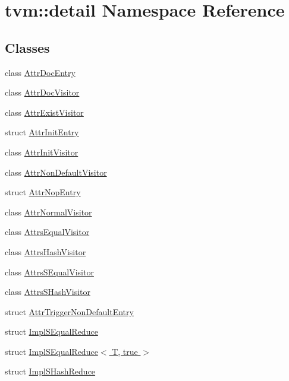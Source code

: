 \hypertarget{namespacetvm_1_1detail}{}\section{tvm\+:\+:detail Namespace Reference}
\label{namespacetvm_1_1detail}
\subsection*{Classes}
\begin{DoxyCompactItemize}
\item 
class \hyperlink{classtvm_1_1detail_1_1AttrDocEntry}{Attr\+Doc\+Entry}
\item 
class \hyperlink{classtvm_1_1detail_1_1AttrDocVisitor}{Attr\+Doc\+Visitor}
\item 
class \hyperlink{classtvm_1_1detail_1_1AttrExistVisitor}{Attr\+Exist\+Visitor}
\item 
struct \hyperlink{structtvm_1_1detail_1_1AttrInitEntry}{Attr\+Init\+Entry}
\item 
class \hyperlink{classtvm_1_1detail_1_1AttrInitVisitor}{Attr\+Init\+Visitor}
\item 
class \hyperlink{classtvm_1_1detail_1_1AttrNonDefaultVisitor}{Attr\+Non\+Default\+Visitor}
\item 
struct \hyperlink{structtvm_1_1detail_1_1AttrNopEntry}{Attr\+Nop\+Entry}
\item 
class \hyperlink{classtvm_1_1detail_1_1AttrNormalVisitor}{Attr\+Normal\+Visitor}
\item 
class \hyperlink{classtvm_1_1detail_1_1AttrsEqualVisitor}{Attrs\+Equal\+Visitor}
\item 
class \hyperlink{classtvm_1_1detail_1_1AttrsHashVisitor}{Attrs\+Hash\+Visitor}
\item 
class \hyperlink{classtvm_1_1detail_1_1AttrsSEqualVisitor}{Attrs\+S\+Equal\+Visitor}
\item 
class \hyperlink{classtvm_1_1detail_1_1AttrsSHashVisitor}{Attrs\+S\+Hash\+Visitor}
\item 
struct \hyperlink{structtvm_1_1detail_1_1AttrTriggerNonDefaultEntry}{Attr\+Trigger\+Non\+Default\+Entry}
\item 
struct \hyperlink{structtvm_1_1detail_1_1ImplSEqualReduce}{Impl\+S\+Equal\+Reduce}
\item 
struct \hyperlink{structtvm_1_1detail_1_1ImplSEqualReduce_3_01T_00_01true_01_4}{Impl\+S\+Equal\+Reduce$<$ T, true $>$}
\item 
struct \hyperlink{structtvm_1_1detail_1_1ImplSHashReduce}{Impl\+S\+Hash\+Reduce}

\end{DoxyCompactItemize}

